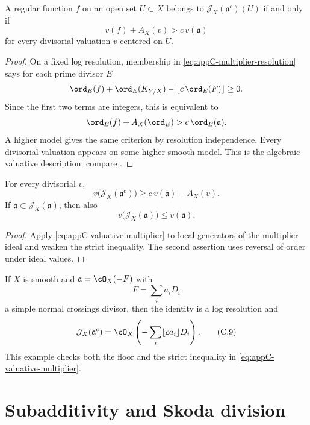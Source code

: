 \begin{theorem}\label{thm:appC-valuative-multiplier}
A regular function \(f\) on an open set \(U\subset X\) belongs to
\(\mathcal J_X(\mathfrak a^c)(U)\) if and only if
\[
 v(f)+A_X(v)>c\,v(\mathfrak a)
\tag{C.7}\label{eq:appC-valuative-multiplier}
\]
for every divisorial valuation \(v\) centered on \(U\).
\end{theorem}

\begin{proof}
On a fixed log resolution, membership in
\eqref{eq:appC-multiplier-resolution} says for each prime divisor \(E\)
\[
 \ord_E(f)+\ord_E(K_{Y/X})
       -\lfloor c\,\ord_E(F)\rfloor\geq0.
\]
Since the first two terms are integers, this is equivalent to
\[
 \ord_E(f)+A_X(\ord_E)>c\,\ord_E(\mathfrak a).
\]
A higher model gives the same criterion by resolution independence.
Every divisorial valuation appears on some higher smooth model.  This is
the algebraic valuative description; compare \cite{JM12}.
\end{proof}

\begin{corollary}\label{cor:appC-multiplier-valuation-bound}
For every divisorial \(v\),
\[
 v\bigl(\mathcal J_X(\mathfrak a^c)\bigr)
 \geq c\,v(\mathfrak a)-A_X(v).
\tag{C.8}\label{eq:appC-multiplier-valuation-bound}
\]
If \(\mathfrak a\subset\mathcal J_X(\mathfrak a)\), then also
\[
 v\bigl(\mathcal J_X(\mathfrak a)\bigr)\leq v(\mathfrak a).
\]
\end{corollary}

\begin{proof}
Apply \eqref{eq:appC-valuative-multiplier} to local generators of the
multiplier ideal and weaken the strict inequality.  The second assertion
uses reversal of order under ideal values.
\end{proof}

\begin{example}
\label{ex:appC-snc}
If \(X\) is smooth and
\(\mathfrak a=\cO_X(-F)\) with
\[
 F=\sum_i a_iD_i
\]
a simple normal crossings divisor, then the identity is a log resolution
and
\[
 \mathcal J_X(\mathfrak a^c)
 =\cO_X\left(-\sum_i\lfloor ca_i\rfloor D_i\right).
\tag{C.9}\label{eq:appC-snc-formula}
\]
This example checks both the floor and the strict inequality in
\eqref{eq:appC-valuative-multiplier}.
\end{example}

\section{Subadditivity and Skoda division}
\label{sec:appC-subadditivity-skoda}

